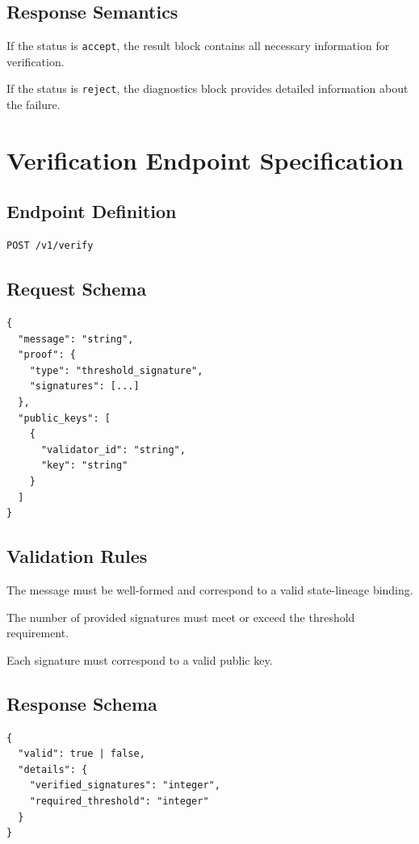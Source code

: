 \subsection{Response Semantics}

If the status is \texttt{accept}, the result block contains all necessary information for verification.

If the status is \texttt{reject}, the diagnostics block provides detailed information about the failure.

\section{Verification Endpoint Specification}

\subsection{Endpoint Definition}

\begin{verbatim}
POST /v1/verify
\end{verbatim}

\subsection{Request Schema}

\begin{verbatim}
{
  "message": "string",
  "proof": {
    "type": "threshold_signature",
    "signatures": [...]
  },
  "public_keys": [
    {
      "validator_id": "string",
      "key": "string"
    }
  ]
}
\end{verbatim}

\subsection{Validation Rules}

The message must be well-formed and correspond to a valid state-lineage binding.

The number of provided signatures must meet or exceed the threshold requirement.

Each signature must correspond to a valid public key.

\subsection{Response Schema}

\begin{verbatim}
{
  "valid": true | false,
  "details": {
    "verified_signatures": "integer",
    "required_threshold": "integer"
  }
}
\end{verbatim}

